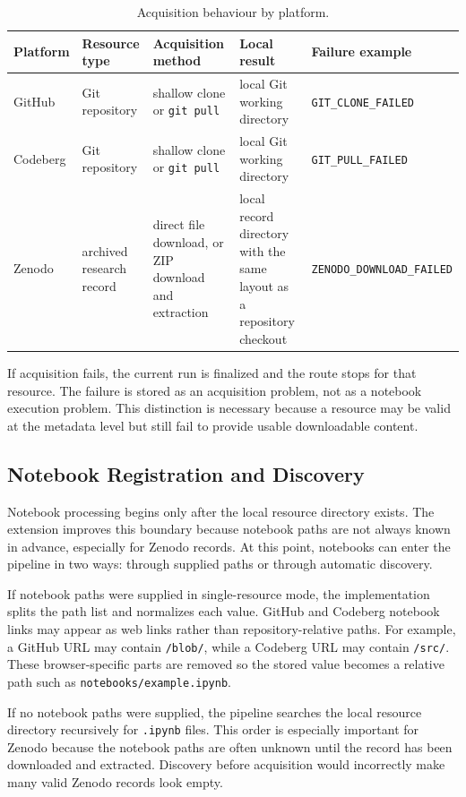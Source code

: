 \begin{table}[ht]
\centering
\caption{Acquisition behaviour by platform.}
\label{tab:acquisition-behaviour}
\small
\begin{tabularx}{\textwidth}{@{}p{1.6cm}p{2.6cm}p{3.0cm}p{2.8cm}X@{}}
\toprule
Platform & Resource type & Acquisition method & Local result & Failure example\tabularnewline
\midrule
GitHub & Git repository & shallow clone or \texttt{git pull} & local Git working directory & \texttt{GIT\_CLONE\_FAILED}\tabularnewline
Codeberg & Git repository & shallow clone or \texttt{git pull} & local Git working directory & \texttt{GIT\_PULL\_FAILED}\tabularnewline
Zenodo & archived research record & direct file download, or ZIP download and extraction & local record directory with the same layout as a repository checkout & \texttt{ZENODO\_}\linebreak\texttt{DOWNLOAD\_FAILED}\tabularnewline
\bottomrule
\end{tabularx}
\end{table}

If acquisition fails, the current run is finalized and the route stops for that resource. The failure is stored as an acquisition problem, not as a notebook execution problem. This distinction is necessary because a resource may be valid at the metadata level but still fail to provide usable downloadable content.

\subsection{Notebook Registration and Discovery}

Notebook processing begins only after the local resource directory exists. The extension improves this boundary because notebook paths are not always known in advance, especially for Zenodo records. At this point, notebooks can enter the pipeline in two ways: through supplied paths or through automatic discovery.

If notebook paths were supplied in single-resource mode, the implementation splits the path list and normalizes each value. GitHub and Codeberg notebook links may appear as web links rather than repository-relative paths. For example, a GitHub URL may contain \texttt{/blob/}, while a Codeberg URL may contain \texttt{/src/}. These browser-specific parts are removed so the stored value becomes a relative path such as \texttt{notebooks/example.ipynb}.

If no notebook paths were supplied, the pipeline searches the local resource directory recursively for \texttt{.ipynb} files. This order is especially important for Zenodo because the notebook paths are often unknown until the record has been downloaded and extracted. Discovery before acquisition would incorrectly make many valid Zenodo records look empty.

